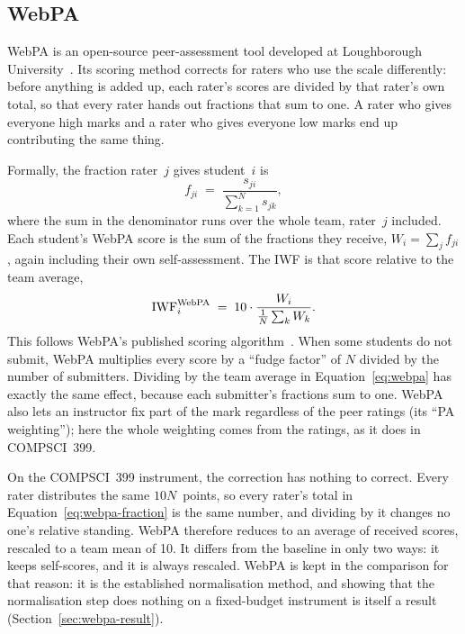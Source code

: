 \subsection{WebPA}
\label{sec:webpa-method}

WebPA is an open-source peer-assessment tool developed at Loughborough
University~\citep{loddington2009webpa}. Its scoring method corrects for raters
who use the scale differently: before anything is added up, each rater's scores
are divided by that rater's own total, so that every rater hands out fractions
that sum to one. A rater who gives everyone high marks and a rater who gives
everyone low marks end up contributing the same thing.

Formally, the fraction rater~$j$ gives student~$i$ is
\begin{equation}
  f_{ji} \;=\; \frac{s_{ji}}{\sum_{k=1}^{N} s_{jk}},
  \label{eq:webpa-fraction}
\end{equation}
where the sum in the denominator runs over the whole team, rater~$j$ included.
Each student's WebPA score is the sum of the fractions they receive,
$W_i = \sum_j f_{ji}$, again including their own self-assessment. The IWF is
that score relative to the team average,
\begin{equation}
  \mathrm{IWF}_i^{\text{WebPA}} \;=\; 10 \cdot \frac{W_i}{\tfrac{1}{N}\sum_{k} W_k}.
  \label{eq:webpa}
\end{equation}
This follows WebPA's published scoring algorithm~\citep{webpa_workedexample}.
When some students do not submit, WebPA multiplies every score by a
``fudge factor'' of $N$ divided by the number of submitters. Dividing by the
team average in Equation~\ref{eq:webpa} has exactly the same effect, because
each submitter's fractions sum to one. WebPA also lets an instructor fix part of
the mark regardless of the peer ratings (its ``PA weighting''); here the whole
weighting comes from the ratings, as it does in COMPSCI~399.

On the COMPSCI~399 instrument, the correction has nothing to correct. Every
rater distributes the same $10N$~points, so every rater's total in
Equation~\ref{eq:webpa-fraction} is the same number, and dividing by it changes
no one's relative standing. WebPA therefore reduces to an average of received
scores, rescaled to a team mean of 10. It differs from the baseline in only two
ways: it keeps self-scores, and it is always rescaled. WebPA is kept in the
comparison for that reason: it is the established normalisation method, and
showing that the normalisation step does nothing on a fixed-budget instrument is
itself a result (Section~\ref{sec:webpa-result}).

